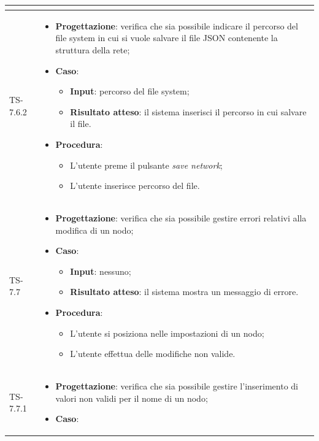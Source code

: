 \begin{longtable}{|C{2.5cm}|C{13cm}|}
\begin{itemize}
\end{itemize}
	 \\
	\hline
	{TS-7.6.2} &
\begin{itemize}
	\item \textbf{Progettazione}: verifica che sia possibile indicare il
	percorso del file system in cui si vuole salvare il file JSON contenente la
	struttura della rete;
	\item \textbf{Caso}: 
	\begin{itemize}
		\item \textbf{Input}: percorso del file system;
		\item \textbf{Risultato atteso}: il sistema inserisci il percorso in cui salvare il file.
	\end{itemize}
	\item \textbf{Procedura}:
	\begin{itemize}
		\item L'utente preme il pulsante \emph{save network};
		\item L'utente inserisce percorso del file.
	\end{itemize} 
\end{itemize}
	  \\
	\hline
	{TS-7.7} & 
\begin{itemize}
	\item \textbf{Progettazione}: verifica che sia possibile gestire errori
	relativi alla modifica di un nodo;
	\item \textbf{Caso}: 
	\begin{itemize}
		\item \textbf{Input}: nessuno;
		\item \textbf{Risultato atteso}: il sistema mostra un messaggio di errore.
	\end{itemize}
	\item \textbf{Procedura}:
	\begin{itemize}
		\item L'utente si posiziona nelle impostazioni di un nodo;
		\item L'utente effettua delle modifiche non valide.
	\end{itemize} 
\end{itemize}
	 \\
	\hline
	{TS-7.7.1} & 
\begin{itemize}
	\item \textbf{Progettazione}: verifica che sia  possibile gestire
	l'inserimento di valori non validi per il nome di un nodo;
	\item \textbf{Caso}: 

\end{itemize}
\end{longtable}
